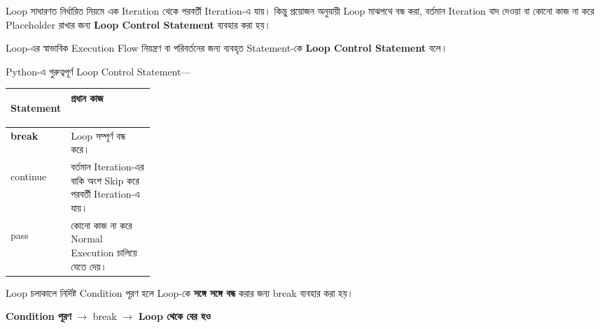
Loop সাধারণত নির্ধারিত নিয়মে এক Iteration থেকে পরবর্তী Iteration-এ যায়।
কিন্তু প্রয়োজন অনুযায়ী Loop মাঝপথে বন্ধ করা, বর্তমান Iteration বাদ দেওয়া
বা কোনো কাজ না করে Placeholder রাখার জন্য
\textbf{Loop Control Statement} ব্যবহার করা হয়।



\begin{definitionbox}

Loop-এর স্বাভাবিক Execution Flow নিয়ন্ত্রণ বা পরিবর্তনের জন্য
ব্যবহৃত Statement-কে \textbf{Loop Control Statement} বলে।

\end{definitionbox}

Python-এ গুরুত্বপূর্ণ Loop Control Statement—

\begin{tabularx}
{\linewidth}
{
|>{\bfseries\centering\arraybackslash}p{0.24\linewidth}
|Y|
}

\hline
{}

\textbf{Statement}
&
\textbf{প্রধান কাজ}
\\
\hline

\textenglish{\ttfamily break}
&
Loop সম্পূর্ণ বন্ধ করে।
\\
\hline

\textenglish{\ttfamily continue}
&
বর্তমান Iteration-এর বাকি অংশ Skip করে পরবর্তী Iteration-এ যায়।
\\
\hline

\textenglish{\ttfamily pass}
&
কোনো কাজ না করে Normal Execution চালিয়ে যেতে দেয়।
\\
\hline

\end{tabularx}



Loop চলাকালে নির্দিষ্ট Condition পূরণ হলে Loop-কে
\textbf{সঙ্গে সঙ্গে বন্ধ} করার জন্য
\textenglish{\ttfamily break}
ব্যবহার করা হয়।

\begin{center}

\textbf{Condition পূরণ}
\(\longrightarrow\)
\textenglish{\ttfamily break}
\(\longrightarrow\)
\textbf{Loop থেকে বের হও}

\end{center}

